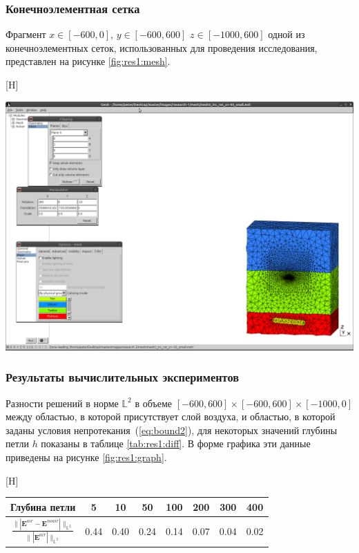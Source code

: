 \documentclass[a4paper,14pt]{article}
\makeatletter
\renewenvironment{figure}[1][\fps@figure]{
  \edef\@tempa{\noexpand\@float{figure}[#1]}
  \@tempa
  \addtocounter{foofigure}{1}
}{
  \end@float
}
\renewenvironment{table}[1][\fps@table]{
  \edef\@tempa{\noexpand\@float{table}[#1]}
  \@tempa
  \addtocounter{footable}{1}
}{
  \end@float
}
\makeatother
\begin{document}
\subsubsection{Конечноэлементная сетка}
Фрагмент $x \in [-600,0]$, $y \in [-600,600]$ $z \in [-1000,600]$ одной из конечноэлементных сеток, использованных для проведения исследования, представлен на рисунке \ref{fig:res1:mesh}.

\begin{figure}[H]
	\centering
	\includegraphics[trim=390mm 20mm 5mm 195mm,clip,scale=0.5]{research-1/mesh/mesh.png}
	\caption{фрагмент конечноэлементной сетки}
	\label{fig:res1:mesh}
\end{figure}

\subsubsection{Результаты вычислительных экспериментов}
Разности решений в норме $\mathbb{L}^2$ в объеме $[-600,600] \times [-600,600] \times [-1000,0]$ между областью, в которой присутствует слой воздуха, и областью, в которой заданы условия непротекания~(\ref{eq:bound2}), для некоторых значений глубины петли $h$ показаны в таблице \ref{tab:res1:diff}. В форме графика эти данные приведены на рисунке \ref{fig:res1:graph}.

\begin{table}[H]
	\caption{относительные разности решений}
	\label{tab:res1:diff}
	\begin{tabularx}{\textwidth}{|C{2.4}|C{0.8}|C{0.8}|C{0.8}|C{0.8}|C{0.8}|C{0.8}|C{0.8}|}
		\hline Глубина петли & 5 & 10 & 50 & 100 & 200 & 300 & 400 \\
		\hline $\displaystyle \frac{\| | \mathbf{E}^{air} - \mathbf{E}^{noair} | \|_{\mathbb{L}^2}}{\| | \mathbf{E}^{air} | \|_{\mathbb{L}^2}}$ & 0.44 & 0.40 & 0.24 & 0.14 & 0.07 & 0.04 & 0.02 \\
		\hline
	\end{tabularx}
\end{table}
\end{document}
